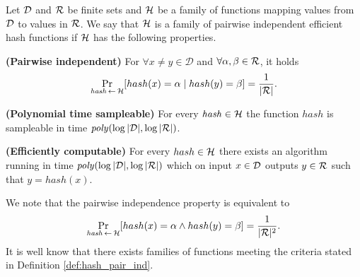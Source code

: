 \begin{definition}
  \label{def:hash_pair_ind}
Let $\mathcal{D}$ and $\mathcal{R}$ be finite sets and $\mathcal{H}$ be a family of functions mapping values from $\mathcal{D}$ to values in $\mathcal{R}$.
We say that $\mathcal{H}$ is a \textnormal{family of pairwise independent efficient hash functions}
if $\mathcal{H}$ has the following properties.

\textbf{(Pairwise independent)} For $\forall x \neq y \in \mathcal{D}$ and $\forall \alpha, \beta \in \mathcal{R}$, it holds
\begin{displaymath}
\underset{\hash \la0 \cH}{\Pr}[hash(x) = \alpha \mid hash(y) = \beta] = \frac{1}{|\cR|}.
\end{displaymath}

\textbf{(Polynomial time sampleable)} For every $\mathit{hash} \in \mathcal{H}$ the function $\mathit{hash}$ is sampleable in time $\mathit{poly}(\log|\mathcal{D}|, \log|\mathcal{R}|)$.

\textbf{(Efficiently computable)}
For every $hash \in \mathcal{H}$ there exists an algorithm running in time $\mathit{poly}(\log|\mathcal{D}|, \log|\mathcal{R}|)$ which
on input $x \in \mathcal{D}$ outputs $y \in \mathcal{R}$ such that $y = hash(x)$.
\end{definition}

We note that the pairwise independence property is equivalent to
\begin{displaymath}
\underset{\hash \la0 \cH}{\Pr}[hash(x) = \alpha \land hash(y) = \beta] = \frac{1}{|\cR|^2}.
\end{displaymath}
It is well know \cite{Carter:1977:UCH:800105.803400} that there exists families of functions meeting the criteria stated in Definition \ref{def:hash_pair_ind}.


